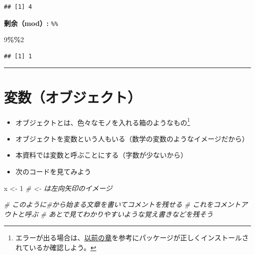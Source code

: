 \documentclass[
]{book}
\newenvironment{Shaded}{\begin{snugshade}}{\end{snugshade}}
\newcommand{\CommentTok}[1]{\textcolor[rgb]{0.56,0.35,0.01}{\textit{#1}}}
\newcommand{\DecValTok}[1]{\textcolor[rgb]{0.00,0.00,0.81}{#1}}
\newcommand{\NormalTok}[1]{#1}
\newcommand{\OtherTok}[1]{\textcolor[rgb]{0.56,0.35,0.01}{#1}}
\newcommand{\SpecialCharTok}[1]{\textcolor[rgb]{0.81,0.36,0.00}{\textbf{#1}}}
\begin{document}
\begin{verbatim}
## [1] 4
\end{verbatim}

\textbf{剰余（mod）:} \texttt{\%\%}

\begin{Shaded}
\begin{Highlighting}[]
\DecValTok{9}\SpecialCharTok{\%\%}\DecValTok{2}
\end{Highlighting}
\end{Shaded}

\begin{verbatim}
## [1] 1
\end{verbatim}

\begin{center}\rule{0.5\linewidth}{0.5pt}\end{center}

\hypertarget{ux5909ux6570ux30aaux30d6ux30b8ux30a7ux30afux30c8}{%
\section{変数（オブジェクト）}\label{ux5909ux6570ux30aaux30d6ux30b8ux30a7ux30afux30c8}}

\begin{itemize}
\item
  オブジェクトとは、色々なモノを入れる箱のようなもの\footnote{エラーが出る場合は、\protect\hyperlink{ux30d1ux30c3ux30b1ux30fcux30b8ux306eux30a4ux30f3ux30b9ux30c8ux30fcux30eb}{以前の章}を参考にパッケージが正しくインストールされているか確認しよう。}\\
\item
  オブジェクトを変数という人もいる（数学の変数のようなイメージだから）
\item
  本資料では変数と呼ぶことにする（字数が少ないから）
\item
  次のコードを見てみよう
\end{itemize}

\begin{Shaded}
\begin{Highlighting}[]
\NormalTok{x }\OtherTok{\textless{}{-}} \DecValTok{1} \CommentTok{\# \textless{}{-} は左向矢印のイメージ}

\CommentTok{\# このように\#から始まる文章を書いてコメントを残せる}
\CommentTok{\# これをコメントアウトと呼ぶ}
\CommentTok{\# あとで見てわかりやすいような覚え書きなどを残そう}
\end{Highlighting}
\end{Shaded}
\end{document}
